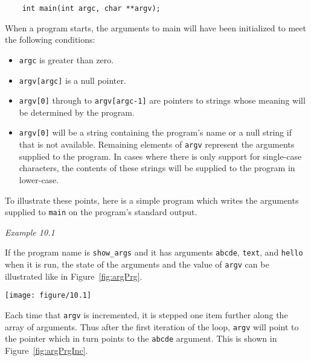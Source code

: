   \begin{Verbatim}
    int main(int argc, char **argv);
  \end{Verbatim}

  When a program starts, the arguments to main will have been initialized
   to meet the following conditions:


  \begin{itemize}
   \item \texttt{argc} is greater than zero.

   \item \texttt{argv[argc]} is a null pointer.

   \item \texttt{argv[0]} through to \texttt{argv[argc-1]} are
    pointers to strings whose meaning will be determined by the
    program.

   \item \texttt{argv[0]} will be a string containing the program's name
    or a null string if that is not available. Remaining elements of
    \texttt{argv} represent the arguments supplied to the program. In
    cases where there is only support for single-case characters, the
    contents of these strings will be supplied to the program in
    lower-case.
  \end{itemize}

  To illustrate these points, here is a simple program which writes the
   arguments supplied to \texttt{main} on the program's standard
   output.


   \begin{center}\textit{Example 10.1}\end{center}


  If the program name is \texttt{show\_args} and it has arguments
   \texttt{abcde}, \texttt{text}, and \texttt{hello} when it is
   run, the state of the arguments and the value of \texttt{argv} can be
   illustrated like in Figure~\ref{fig:argPrg}.


   \begin{figure*}\centering
     \texttt{[image: figure/10.1]}
     \caption*{Diagram showing the relationship between 'argc' and 'argv'                and the strings that elements of 'argv' point to}
     \caption{\label{fig:argPrg}Arguments to a program}
   \end{figure*}


  
  Each time that \texttt{argv} is incremented, it is stepped one item
   further along the array of arguments. Thus after the first iteration of
   the loop, \texttt{argv} will point to the pointer which in turn
   points to the \texttt{abcde} argument.  This is shown in
   Figure~\ref{fig:argPrgInc}.


